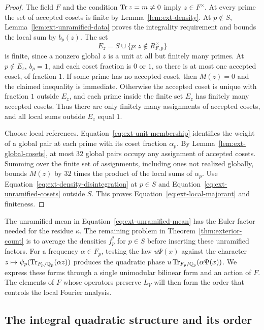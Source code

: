 \begin{proof}
The field \(F\) and the condition \(\operatorname{Tr} z=m\ne0\) imply
\(z\in F^\times\).  At every prime the set of accepted cosets is
finite by Lemma~\ref{lem:ext-density}.  At \(p\notin S\),
Lemma~\ref{lem:ext-unramified-data} proves the integrality requirement
and bounds the local sum by \(b_p(z)\).  The set
\[
 E_z=S\cup\{p:z\notin R_{F,p}^\times\}
\]
is finite, since a nonzero global \(z\) is a unit at all but finitely
many primes.  At \(p\notin E_z\), \(b_p=1\), and each coset fraction is
\(0\) or \(1\), so there is at most one accepted coset, of fraction
\(1\).  If some prime has no accepted coset, then \(M(z)=0\) and the
claimed inequality is immediate.  Otherwise the accepted coset is
unique with fraction \(1\) outside \(E_z\), and each prime inside the
finite set \(E_z\) has finitely many accepted cosets.  Thus there are
only finitely many assignments of accepted cosets, and all local sums
outside \(E_z\) equal \(1\).

Choose local references.  Equation~\eqref{eq:ext-unit-membership}
identifies the weight of a global pair at each prime with its coset
fraction \(\alpha_p\).  By Lemma~\ref{lem:ext-global-cosets}, at most
\(32\) global pairs occupy any assignment of accepted cosets.
Summing over the finite set of assignments, including ones not
realized globally, bounds \(M(z)\) by \(32\) times the product of the
local sums of \(\alpha_p\).  Use
Equation~\eqref{eq:ext-density-disintegration} at \(p\in S\) and
Equation~\eqref{eq:ext-unramified-cosets} outside \(S\).
This proves Equation~\eqref{eq:ext-local-majorant} and finiteness.
\end{proof}

The unramified mean in Equation~\eqref{eq:ext-unramified-mean} has the
Euler factor needed for the residue \(\kappa\).  The remaining problem
in Theorem~\ref{thm:exterior-count} is to average the densities
\(f_p^*\) for \(p\in S\) before inserting these unramified factors.
For a frequency \(\alpha\in F_p\), testing the law \(u\Psi(x)\) against
the character \(z\mapsto\psi_p(\operatorname{Tr}_{F_p/\mathbb Q_p}(\alpha z))\) produces the
quadratic phase \(u\operatorname{Tr}_{F_p/\mathbb Q_p}(\alpha\Psi(x))\).
We express these forms through a single unimodular bilinear form and an
action of \(F\).  The elements of \(F\) whose operators preserve \(L_V\)
will then form the order that controls the local Fourier analysis.

\subsection{The integral quadratic structure and its order}

